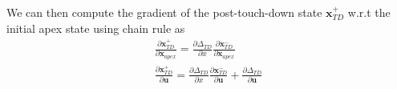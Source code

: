 \documentclass{article}
\begin{document}
We can then compute the gradient of the post-touch-down state $\mathbf{x}_{TD}^+$ w.r.t the initial apex state using chain rule as
\begin{align}
	\frac{\partial \mathbf{x}_{TD}^+}{\partial \mathbf{x}_{apex}} = \frac{\partial \Delta_{TD}}{\partial x}\frac{\partial \mathbf{x}_{TD}^-}{\partial \mathbf{x}_{apex}}\\
	\frac{\partial \mathbf{x}_{TD}^+}{\partial \mathbf{u}} = \frac{\partial \Delta_{TD}}{\partial x}\frac{\partial \mathbf{x}_{TD}^-}{\partial \mathbf{u}} + \frac{\partial \Delta_{TD}}{\partial \mathbf{u}}
\end{align}
\end{document}
